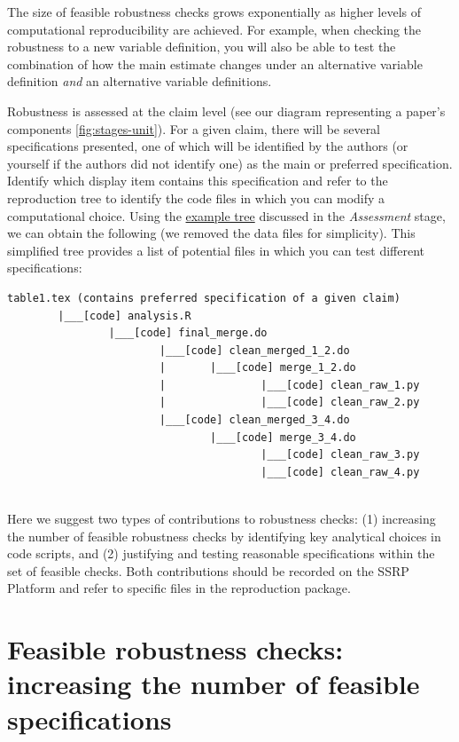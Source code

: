 \documentclass[]{book}
\begin{document}
The size of feasible robustness checks grows exponentially as higher levels of computational reproducibility are achieved. For example, when checking the robustness to a new variable definition, you will also be able to test the combination of how the main estimate changes under an alternative variable definition \emph{and} an alternative variable definitions.

Robustness is assessed at the claim level (see our diagram representing a paper's components \ref{fig:stages-unit}). For a given claim, there will be several specifications presented, one of which will be identified by the authors (or yourself if the authors did not identify one) as the main or preferred specification. Identify which display item contains this specification and refer to the reproduction tree to identify the code files in which you can modify a computational choice. Using the \protect\hyperlink{complete-tree}{example tree} discussed in the \emph{Assessment} stage, we can obtain the following (we removed the data files for simplicity). This simplified tree provides a list of potential files in which you can test different specifications:

\begin{verbatim}
table1.tex (contains preferred specification of a given claim)
        |___[code] analysis.R
                |___[code] final_merge.do
                        |___[code] clean_merged_1_2.do
                        |       |___[code] merge_1_2.do
                        |               |___[code] clean_raw_1.py
                        |               |___[code] clean_raw_2.py
                        |___[code] clean_merged_3_4.do
                                |___[code] merge_3_4.do
                                        |___[code] clean_raw_3.py
                                        |___[code] clean_raw_4.py
                                        
\end{verbatim}

Here we suggest two types of contributions to robustness checks: (1) increasing the number of feasible robustness checks by identifying key analytical choices in code scripts, and (2) justifying and testing reasonable specifications within the set of feasible checks. Both contributions should be recorded on the SSRP Platform and refer to specific files in the reproduction package.

\hypertarget{feasible-robustness-checks-increasing-the-number-of-feasible-specifications}{%
\section{Feasible robustness checks: increasing the number of feasible specifications}\label{feasible-robustness-checks-increasing-the-number-of-feasible-specifications}}
\end{document}
